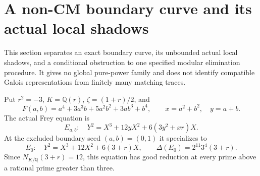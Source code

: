 \section{A non-CM boundary curve and its actual local shadows}
\label{bs-section}

This section separates an exact boundary curve, its unbounded actual
local shadows, and a conditional obstruction to one specified modular
elimination procedure. It gives no global pure-power family and does
not identify compatible Galois representations from finitely many
matching traces.

Put $r^2=-3$, $K=\mathbb Q(r)$, $\zeta=(1+r)/2$, and
\[
 F(a,b)=a^4+3a^3b+5a^2b^2+3ab^3+b^4,
 \qquad x=a^2+b^2,\quad y=a+b.
\]
The actual Frey equation is
\[
 E_{a,b}:\quad Y^2=X^3+12yX^2+6(3y^2+xr)X.
\]
At the excluded boundary seed $(a,b)=(0,1)$ it specializes to
\[
 E_0:\quad Y^2=X^3+12X^2+6(3+r)X,
 \qquad \Delta(E_0)=2^{11}3^4(3+r).
\]
Since $N_{K/\mathbb Q}(3+r)=12$, this equation has good reduction
at every prime above a rational prime greater than three.

